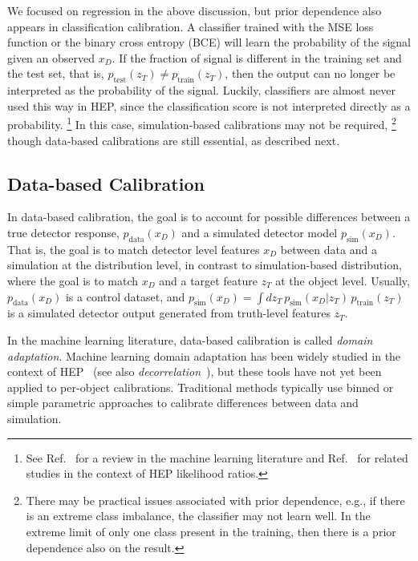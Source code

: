 \documentclass[aps,prd,reprint,preprintnumbers,superscriptaddress,nofootinbib,longbibliography,floatfix]{revtex4-1}
\DeclareRobustCommand{\Ref}[1]{Ref.~\cite{#1}}
\begin{document}
We focused on regression in the above discussion, but prior dependence also appears in classification calibration.
%
A classifier trained with the MSE loss function or the binary cross entropy (BCE) will learn the probability of the signal given an observed $x_D$.
%
If the fraction of signal is different in the training set and the test set, that is, $p_\text{test}(z_T) \not= p_\text{train}(z_T)$, then the output can no longer be interpreted as the probability of the signal.
%
Luckily, classifiers are almost never used this way in HEP, since the classification score is not interpreted directly as a probability.%
%
\footnote{See \Ref{pmlr-v70-guo17a} for a review in the machine learning literature and \Ref{Cranmer:2015bka} for related studies in the context of HEP likelihood ratios.}
%
In this case, simulation-based calibrations may not be required,%
%
\footnote{There may be practical issues associated with prior dependence, e.g., if there is an extreme class imbalance, the classifier may not learn well.  In the extreme limit of only one class present in the training, then there is a prior dependence also on the result.}
%
though data-based calibrations are still essential, as described next.







\subsection{Data-based Calibration}
\label{sec:databased}

In data-based calibration, the goal is to account for possible differences between a true detector response, $p_{\text{data}}(x_D)$ and a simulated detector model $p_{\text{sim}}(x_D)$.
%
That is, the goal is to match detector level features $x_D$ between data and a simulation at the distribution level, in contrast to simulation-based distribution, where the goal is to match $x_D$ and a target feature $z_T$ at the object level.
%
Usually, $p_{\text{data}}(x_D)$ is a control dataset, and $p_{\text{sim}}(x_D) = \int dz_T\, p_{\text{sim}}(x_D|z_T)\,p_{\text{train}}(z_T)$ is a simulated detector output generated from truth-level features $z_T$.

In the machine learning literature, data-based calibration is called \textit{domain adaptation}.
%
Machine learning domain adaptation has been widely studied in the context of HEP~\cite{Rogozhnikov:2016bdp,Andreassen:2019nnm,Cranmer:2015bka,2009.03796,Nachman:2021opi} (see also \textit{decorrelation}~\cite{Louppe:2016ylz,Dolen:2016kst,Moult:2017okx,Stevens:2013dya,Shimmin:2017mfk,Bradshaw:2019ipy,ATL-PHYS-PUB-2018-014,DiscoFever,Xia:2018kgd,Englert:2018cfo,Wunsch:2019qbo,Rogozhnikov:2014zea,10.1088/2632-2153/ab9023,clavijo2020adversarial,Kasieczka:2020pil,Kitouni:2020xgb,Ghosh:2021hrh}), but these tools have not yet been applied to per-object calibrations.
%
Traditional methods typically use binned or simple parametric approaches to calibrate differences between data and simulation.
\end{document}
